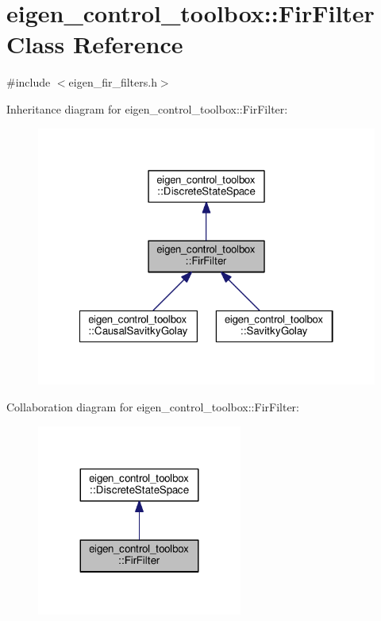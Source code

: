 \hypertarget{classeigen__control__toolbox_1_1_fir_filter}{}\section{eigen\+\_\+control\+\_\+toolbox\+:\+:Fir\+Filter Class Reference}
\label{classeigen__control__toolbox_1_1_fir_filter}


{\ttfamily \#include $<$eigen\+\_\+fir\+\_\+filters.\+h$>$}



Inheritance diagram for eigen\+\_\+control\+\_\+toolbox\+:\+:Fir\+Filter\+:
\nopagebreak
\begin{figure}[H]
\begin{center}
\leavevmode
\includegraphics[width=322pt]{classeigen__control__toolbox_1_1_fir_filter__inherit__graph}
\end{center}
\end{figure}


Collaboration diagram for eigen\+\_\+control\+\_\+toolbox\+:\+:Fir\+Filter\+:
\nopagebreak
\begin{figure}[H]
\begin{center}
\leavevmode
\includegraphics[width=191pt]{classeigen__control__toolbox_1_1_fir_filter__coll__graph}
\end{center}
\end{figure}
